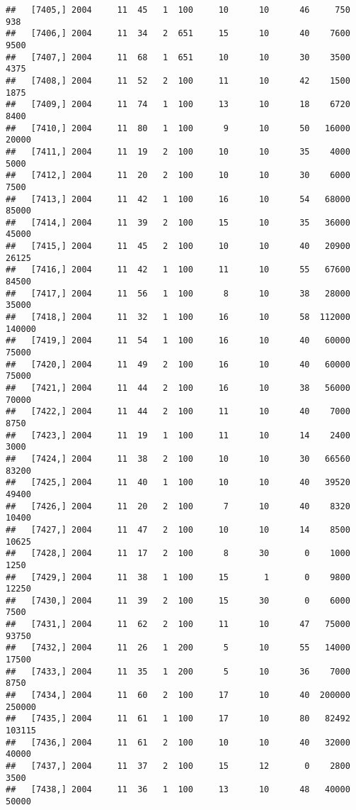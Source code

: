 \documentclass{article}\usepackage[]{graphicx}\usepackage[]{color}
\makeatletter
\newenvironment{kframe}{%
 \def\at@end@of@kframe{}%
 \ifinner\ifhmode%
  \def\at@end@of@kframe{\end{minipage}}%
  \begin{minipage}{\columnwidth}%
 \fi\fi%
 \def\FrameCommand##1{\hskip\@totalleftmargin \hskip-\fboxsep
 \colorbox{shadecolor}{##1}\hskip-\fboxsep
     \hskip-\linewidth \hskip-\@totalleftmargin \hskip\columnwidth}%
 \MakeFramed {\advance\hsize-\width
   \@totalleftmargin\z@ \linewidth\hsize
   \@setminipage}}%
 {\par\unskip\endMakeFramed%
 \at@end@of@kframe}
\newenvironment{knitrout}{}{} %
\makeatother
\begin{document}
\begin{knitrout}
\begin{kframe}
\begin{verbatim}
##   [7405,] 2004     11  45   1  100     10      10      46     750     938
##   [7406,] 2004     11  34   2  651     15      10      40    7600    9500
##   [7407,] 2004     11  68   1  651     10      10      30    3500    4375
##   [7408,] 2004     11  52   2  100     11      10      42    1500    1875
##   [7409,] 2004     11  74   1  100     13      10      18    6720    8400
##   [7410,] 2004     11  80   1  100      9      10      50   16000   20000
##   [7411,] 2004     11  19   2  100     10      10      35    4000    5000
##   [7412,] 2004     11  20   2  100     10      10      30    6000    7500
##   [7413,] 2004     11  42   1  100     16      10      54   68000   85000
##   [7414,] 2004     11  39   2  100     15      10      35   36000   45000
##   [7415,] 2004     11  45   2  100     10      10      40   20900   26125
##   [7416,] 2004     11  42   1  100     11      10      55   67600   84500
##   [7417,] 2004     11  56   1  100      8      10      38   28000   35000
##   [7418,] 2004     11  32   1  100     16      10      58  112000  140000
##   [7419,] 2004     11  54   1  100     16      10      40   60000   75000
##   [7420,] 2004     11  49   2  100     16      10      40   60000   75000
##   [7421,] 2004     11  44   2  100     16      10      38   56000   70000
##   [7422,] 2004     11  44   2  100     11      10      40    7000    8750
##   [7423,] 2004     11  19   1  100     11      10      14    2400    3000
##   [7424,] 2004     11  38   2  100     10      10      30   66560   83200
##   [7425,] 2004     11  40   1  100     10      10      40   39520   49400
##   [7426,] 2004     11  20   2  100      7      10      40    8320   10400
##   [7427,] 2004     11  47   2  100     10      10      14    8500   10625
##   [7428,] 2004     11  17   2  100      8      30       0    1000    1250
##   [7429,] 2004     11  38   1  100     15       1       0    9800   12250
##   [7430,] 2004     11  39   2  100     15      30       0    6000    7500
##   [7431,] 2004     11  62   2  100     11      10      47   75000   93750
##   [7432,] 2004     11  26   1  200      5      10      55   14000   17500
##   [7433,] 2004     11  35   1  200      5      10      36    7000    8750
##   [7434,] 2004     11  60   2  100     17      10      40  200000  250000
##   [7435,] 2004     11  61   1  100     17      10      80   82492  103115
##   [7436,] 2004     11  61   2  100     10      10      40   32000   40000
##   [7437,] 2004     11  37   2  100     15      12       0    2800    3500
##   [7438,] 2004     11  36   1  100     13      10      48   40000   50000

\end{verbatim}
\end{kframe}
\end{knitrout}
\end{document}

